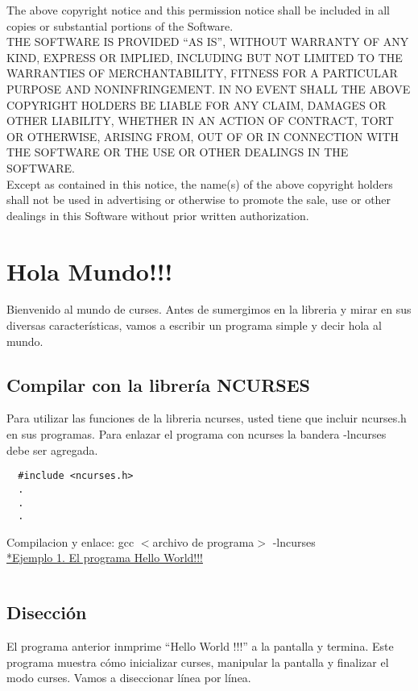 \documentclass{article}
\begin{document}
The above copyright notice and this permission notice shall be included in all
copies or substantial portions of the Software.\\

THE SOFTWARE IS PROVIDED “AS IS”, WITHOUT WARRANTY OF ANY KIND, EXPRESS OR
IMPLIED, INCLUDING BUT NOT LIMITED TO THE WARRANTIES OF MERCHANTABILITY,
FITNESS FOR A PARTICULAR PURPOSE AND NONINFRINGEMENT. IN NO EVENT SHALL THE
ABOVE COPYRIGHT HOLDERS BE LIABLE FOR ANY CLAIM, DAMAGES OR OTHER LIABILITY,
WHETHER IN AN ACTION OF CONTRACT, TORT OR OTHERWISE, ARISING FROM, OUT OF OR IN
CONNECTION WITH THE SOFTWARE OR THE USE OR OTHER DEALINGS IN THE SOFTWARE.\\

Except as contained in this notice, the name(s) of the above copyright holders
shall not be used in advertising or otherwise to promote the sale, use or other
dealings in this Software without prior written authorization.\\

\section{Hola Mundo!!!}%
Bienvenido al mundo de curses. Antes de sumergimos en la libreria y mirar en
sus diversas características, vamos a escribir un programa simple y decir hola
al mundo.\\

\subsection{Compilar con la librería NCURSES}%
Para utilizar las funciones de la libreria ncurses, usted tiene que incluir
ncurses.h en sus programas. Para enlazar el programa con ncurses la bandera
-lncurses debe ser agregada.

\begin{verbatim}
  #include <ncurses.h>
  .
  .
  .
\end{verbatim}

Compilacion y enlace: gcc $<$archivo de programa$>$ -lncurses\\

\href{https://github.com/nasciiboy/NCURSES-Programming-HOWTO/blob/master/ncurses_programs/basics/hello_world.c}{*Ejemplo 1. El programa Hello World!!!}
\inputminted{cpp}{./cpp/001_hello_world.cpp}

\subsection{Disección}%
El programa anterior inmprime “Hello World !!!” a la pantalla y termina. Este
programa muestra cómo inicializar curses, manipular la pantalla y finalizar el
modo curses. Vamos a diseccionar línea por línea.\\
\end{document}
